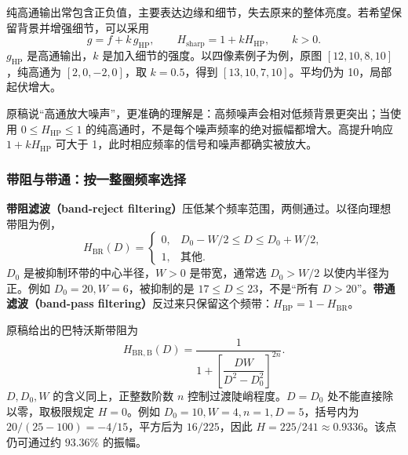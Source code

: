 纯高通输出常包含正负值，主要表达边缘和细节，失去原来的整体亮度。若希望保留背景并增强细节，可以采用
\[
g=f+k\,g_{\mathrm{HP}},\qquad
H_{\mathrm{sharp}}=1+kH_{\mathrm{HP}},\qquad k>0.
\]
$g_{\mathrm{HP}}$ 是高通输出，$k$ 是加入细节的强度。以四像素例子为例，原图 $[12,10,8,10]$，纯高通为 $[2,0,-2,0]$，取 $k=0.5$，得到 $[13,10,7,10]$。平均仍为 10，局部起伏增大。

原稿说“高通放大噪声”，更准确的理解是：高频噪声会相对低频背景更突出；当使用 $0\leq H_{\mathrm{HP}}\leq1$ 的纯高通时，不是每个噪声频率的绝对振幅都增大。高提升响应 $1+kH_{\mathrm{HP}}$ 可大于 1，此时相应频率的信号和噪声都确实被放大。

\subsubsection{带阻与带通：按一整圈频率选择}
\textbf{带阻滤波（band-reject filtering）}压低某个频率范围，两侧通过。以径向理想带阻为例，
\[
H_{\mathrm{BR}}(D)=
\begin{cases}
0,&D_0-W/2\leq D\leq D_0+W/2,\\
1,&\text{其他}.
\end{cases}
\]
$D_0$ 是被抑制环带的中心半径，$W>0$ 是带宽，通常选 $D_0>W/2$ 以使内半径为正。例如 $D_0=20,W=6$，被抑制的是 $17\leq D\leq23$，不是“所有 $D>20$”。\textbf{带通滤波（band-pass filtering）}反过来只保留这个频带：$H_{\mathrm{BP}}=1-H_{\mathrm{BR}}$。

原稿给出的巴特沃斯带阻为
\[
H_{\mathrm{BR,B}}(D)=
\frac{1}{1+\left[\dfrac{DW}{D^2-D_0^2}\right]^{2n}}.
\]
$D,D_0,W$ 的含义同上，正整数阶数 $n$ 控制过渡陡峭程度。$D=D_0$ 处不能直接除以零，取极限规定 $H=0$。例如 $D_0=10,W=4,n=1,D=5$，括号内为 $20/(25-100)=-4/15$，平方后为 $16/225$，因此 $H=225/241\approx0.9336$。该点仍可通过约 $93.36\%$ 的振幅。

\begin{center}
\end{center}

